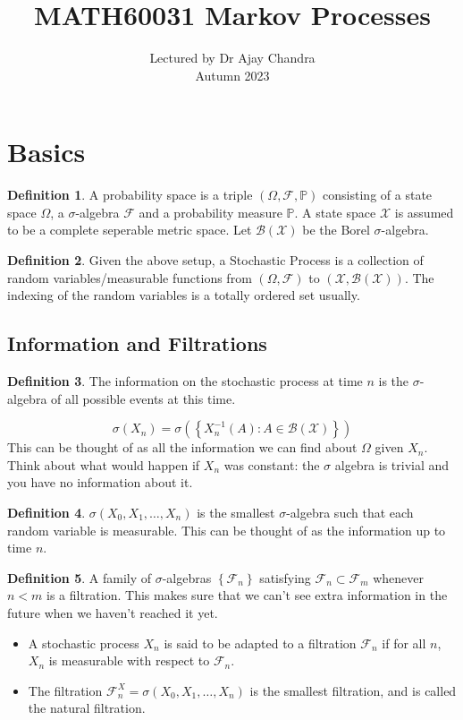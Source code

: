 \documentclass{article}
\title{MATH60031 Markov Processes}
\author{Lectured by Dr Ajay Chandra\\
Autumn 2023\\
}
\date{}
\numberwithin{equation}{section}
\theoremstyle{definition}
\newtheorem{definition}{Definition}[section]
\newcommand{\pr}{\mathbb{P}}
\newcommand{\borelx}{\mc{B}(\mc{X})}
\newcommand{\mc}[1]{\mathcal{#1}}
\newcommand{\pspace}{(\Omega, \mathcal{F}, \mathbb{P})}
\begin{document}
\maketitle


\section{Basics}
\begin{definition}
    A probability space is a triple $\pspace$ consisting of a state space $\Omega$, a $\sigma$-algebra $\mc{F}$ and a probability measure $\pr$.
    A state space $\mc{X}$ is assumed to be a complete seperable metric space. Let $\borelx$ be the Borel $\sigma$-algebra.
\end{definition}

\begin{definition}
    Given the above setup, a Stochastic Process is a collection of random variables/measurable functions from $(\Omega,\mc{F})$ to $(\mc{X}, \borelx)$. The indexing of the random variables is a totally ordered set usually.
\end{definition}

\subsection{Information and Filtrations}
\begin{definition}
    The information on the stochastic process at time $n$ is the $\sigma$-algebra of all possible events at this time.

    \begin{equation}
        \sigma(X_n) = \sigma
        \left(
            \left\{
                X_n^{-1}(A): A\in\borelx
            \right\}
        \right)
    \end{equation}
    This can be thought of as all the information we can find about $\Omega$ given $X_n$. Think about what would happen if $X_n$ was constant: the $\sigma$ algebra is trivial and you have no information about it.
\end{definition}
\begin{definition}
    $\sigma(X_0, X_1, \ldots ,X_n)$ is the smallest $\sigma$-algebra such that each random variable is measurable. This can be thought of as the information up to time $n$.
\end{definition}
\begin{definition}
    A family of $\sigma$-algebras $\left\{\mc{F}_n\right\}$ satisfying $\mc{F}_n \subset \mc{F}_m$ whenever $n<m$ is a filtration. This makes sure that we can't see extra information in the future when we haven't reached it yet.
    \begin{itemize}
        \item A stochastic process $X_n$ is said to be adapted to a filtration $\mc{F}_n$ if for all $n$, $X_n$ is measurable with respect to $\mc{F}_n$.
        \item The filtration $\mc{F}_n^X =  \sigma(X_0, X_1, \ldots ,X_n)$ is the smallest filtration, and is called the natural filtration.
    \end{itemize}
\end{definition}
\end{document}
